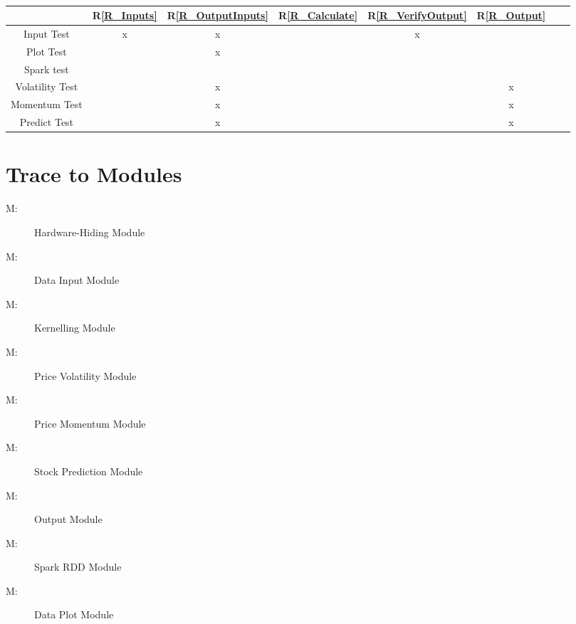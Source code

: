 \documentclass[12pt, titlepage]{article}
\newcommand{\rref}[1]{R\ref{#1}}
\newcounter{mnum}
\newcommand{\mthemnum}{M\themnum}
\begin{document}
~\newline
\begin{table}[h!]
\centering
\begin{tabular}{|c|c|c|c|c|c|c|c|}
\hline
& \rref{R_Inputs}& \rref{R_OutputInputs} & \rref{R_Calculate}& \rref{R_VerifyOutput}& \rref{R_Output} \\
\hline


Input Test &x&x & &x &\\ \hline
Plot Test & &x & & & \\ \hline
Spark test && & & & \\ \hline
Volatility Test & & x& & &x \\ \hline
Momentum Test & & x& & &x \\ \hline
Predict Test & & x& & &x \\ \hline
\hline
\end{tabular}

\label{Table:R_trace}
\end{table}
\section{Trace to Modules} 
\begin{description}
\item [ \mthemnum \label{mHH}:] Hardware-Hiding Module
\item [ \mthemnum \label{mInput}:] Data Input Module
\item [ \mthemnum \label{mKernelling}:]Kernelling Module
\item [ \mthemnum \label{mVolatility}:] Price Volatility Module
\item [ \mthemnum \label{mMomentum}:] Price Momentum Module
\item [ \mthemnum \label{mPrediction}:] Stock Prediction Module
\item [ \mthemnum \label{mOutput}:] Output Module
\item [ \mthemnum \label{mSpark}:] Spark RDD Module
\item [ \mthemnum \label{mPlot}:] Data Plot Module
\end{description}
\end{document}

